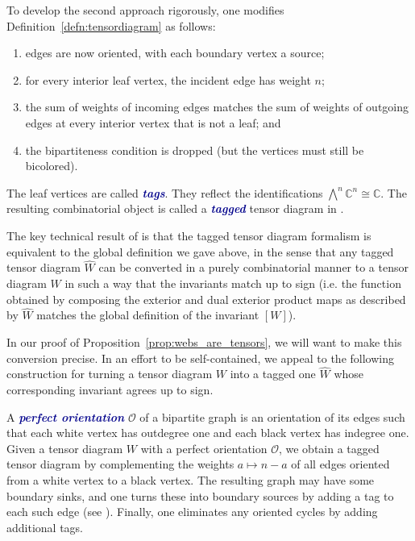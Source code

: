 \documentclass[ALCO, Unicode]{cedram}
\numberwithin{equation}{section}
\newcommand{\newword}[1]{\textcolor{darkblue}{\textbf{\emph{#1}}}}
\begin{document}
To develop the second approach rigorously, one modifies Definition~\ref{defn:tensordiagram} as follows: 
\begin{enumerate}
    \item edges are now oriented, with each boundary vertex a source;
    \item for every interior leaf vertex, the incident edge has weight $n$; 
    \item the sum of weights of incoming edges matches the sum of weights of outgoing edges at every interior vertex that is not a leaf; and 
    \item the bipartiteness condition is dropped (but the vertices must still be bicolored).
\end{enumerate} 
The leaf vertices are called \newword{tags}. They reflect the identifications $\bigwedge^n \mathbb{C}^n \cong \mathbb{C}$. The resulting combinatorial object is called a \newword {tagged} tensor diagram in \cite{Fraser.Lam.Le}. 

The key technical result of \cite{Fraser.Lam.Le} is that the tagged tensor diagram formalism is equivalent to the global definition we gave above, in the sense that any tagged tensor diagram $\widehat{W}$ can be converted in a purely combinatorial manner to a tensor diagram $W$ in such a way that the invariants match up to sign (i.e. the function obtained by composing the exterior and dual exterior product maps as described by $\widehat{W}$ matches the global definition of the invariant $[W]$). 

In our proof of Proposition~\ref{prop:webs_are_tensors}, we will want to make this conversion precise. 
In an effort to be self-contained, we appeal to the following construction \cite[Remark 3.3]{Fraser.Lam.Le} for turning a tensor diagram $W$ into a tagged one $\widehat{W}$ whose corresponding invariant agrees up to sign. 

A \newword{perfect orientation} $\mathcal{O}$ of a bipartite graph is an orientation of its edges such that each white vertex has outdegree one and each black vertex has indegree one. Given a tensor diagram $W$ with a perfect orientation $\mathcal{O}$, we obtain a tagged tensor diagram 
by complementing the weights $a \mapsto n-a$ of all edges oriented from a white vertex to a black vertex. The resulting graph may have some boundary sinks, and one turns these into boundary sources by adding a tag to each such edge (see \cite[Eq.~(3.3)]{Fraser.Lam.Le}). Finally, one eliminates any oriented cycles by adding additional tags.
\end{document}
